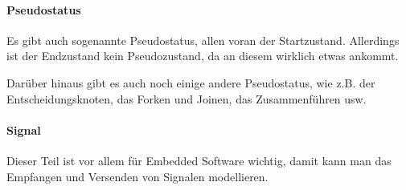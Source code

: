 \paragraph{Pseudostatus}
Es gibt auch sogenannte Pseudostatus, allen voran der Startzustand. Allerdings ist der Endzustand kein Pseudozustand, da an diesem wirklich etwas ankommt.

Darüber hinaus gibt es auch noch einige andere Pseudostatus, wie z.B. der Entscheidungsknoten, das Forken und Joinen, das Zusammenführen usw.

\paragraph{Signal}
Dieser Teil ist vor allem für Embedded Software wichtig, damit kann man das Empfangen und Versenden von Signalen modellieren.

